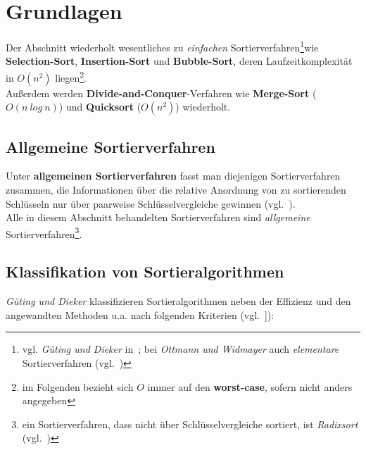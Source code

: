 \section{Grundlagen}

Der Abschnitt wiederholt wesentliches zu \textit{einfachen} Sortierverfahren\footnote{
    vgl. \textit{Güting und Dieker} in~\cite[170]{GD18e}; bei \textit{Ottmann und Widmayer} auch \textit{elementare} Sortierverfahren (vgl.~\cite[82 ff.]{OW17b})
}wie \textbf{Selection-Sort}, \textbf{Insertion-Sort} und \textbf{Bubble-Sort}, deren Laufzeitkomplexität in $O(n^2)$ liegen\footnote{
im Folgenden bezieht sich $O$ immer auf den \textbf{worst-case}, sofern nicht anders angegeben
}.\\
Außerdem werden \textbf{Divide-and-Conquer}-Verfahren wie \textbf{Merge-Sort} ($O(n\ log\ n)$) und \textbf{Quicksort} ($O(n^2)$) wiederholt.

\subsection{Allgemeine Sortierverfahren}
Unter \textbf{allgemeinen Sortierverfahren} fasst man diejenigen Sortierverfahren zusammen, die Informationen über die relative Anordnung von zu sortierenden Schlüsseln nur über paarweise Schlüsselvergleiche gewinnen (vgl.~\cite[130]{OW17b}).\\
Alle in diesem Abschnitt behandelten Sortierverfahren sind \textit{allgemeine} Sortierverfahren\footnote{
ein Sortierverfahren, dass nicht über Schlüsselvergleiche sortiert, ist \textit{Radixsort} (vgl.~\cite[121]{OW17b})
}.

\subsection{Klassifikation von Sortieralgorithmen}

\textit{Güting und Dieker} klassifizieren Sortieralgorithmen neben der Effizienz und den angewandten Methoden u.a. nach folgenden Kriterien (vgl.~\cite[169 f.]{GD18e}]):

